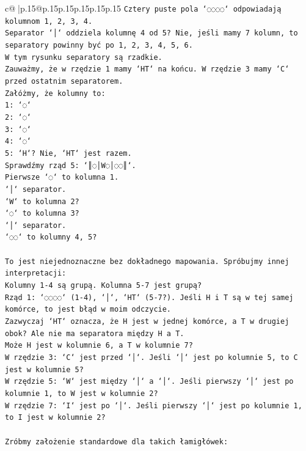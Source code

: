 \documentclass{article}
\begin{document}
{\begin{supertabular}{c@{$\;$}|p{.15\linewidth}@{}p{.15\linewidth}p{.15\linewidth}p{.15\linewidth}p{.15\linewidth}p{.15\linewidth}}
{{{\texttt{Cztery puste pola `◌◌◌◌` odpowiadają kolumnom 1, 2, 3, 4.} \\
\texttt{Separator `│` oddziela kolumnę 4 od 5? Nie, jeśli mamy 7 kolumn, to separatory powinny być po 1, 2, 3, 4, 5, 6.} \\
\texttt{W tym rysunku separatory są rzadkie.} \\
\texttt{Zauważmy, że w rzędzie 1 mamy `HT` na końcu. W rzędzie 3 mamy `C` przed ostatnim separatorem.} \\
\texttt{Załóżmy, że kolumny to:} \\
\texttt{1: `◌`} \\
\texttt{2: `◌`} \\
\texttt{3: `◌`} \\
\texttt{4: `◌`} \\
\texttt{5: `H`? Nie, `HT` jest razem.} \\
\texttt{Sprawdźmy rząd 5: `║◌│W◌│◌◌║`.} \\
\texttt{Pierwsze `◌` to kolumna 1.} \\
\texttt{`│` separator.} \\
\texttt{`W` to kolumna 2?} \\
\texttt{`◌` to kolumna 3?} \\
\texttt{`│` separator.} \\
\texttt{`◌◌` to kolumny 4, 5?} \\
\\ 
\texttt{To jest niejednoznaczne bez dokładnego mapowania. Spróbujmy innej interpretacji:} \\
\texttt{Kolumny 1{-}4 są grupą. Kolumna 5{-}7 jest grupą?} \\
\texttt{Rząd 1: `◌◌◌◌` (1{-}4), `│`, `HT` (5{-}7?). Jeśli H i T są w tej samej komórce, to jest błąd w moim odczycie.} \\
\texttt{Zazwyczaj `HT` oznacza, że H jest w jednej komórce, a T w drugiej obok? Ale nie ma separatora między H a T.} \\
\texttt{Może H jest w kolumnie 6, a T w kolumnie 7?} \\
\texttt{W rzędzie 3: `C` jest przed `│`. Jeśli `│` jest po kolumnie 5, to C jest w kolumnie 5?} \\
\texttt{W rzędzie 5: `W` jest między `│` a `│`. Jeśli pierwszy `│` jest po kolumnie 1, to W jest w kolumnie 2?} \\
\texttt{W rzędzie 7: `I` jest po `│`. Jeśli pierwszy `│` jest po kolumnie 1, to I jest w kolumnie 2?} \\
\\ 
\texttt{Zróbmy założenie standardowe dla takich łamigłówek:} \\
}}}
\end{supertabular}}
\end{document}
